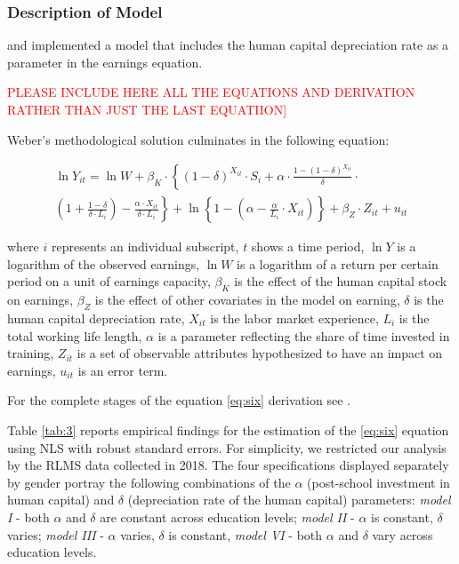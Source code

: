 \documentclass[12pt,a4paper]{article}
\numberwithin{equation}{section}
\begin{document}
\subsubsection{Description of Model}

\citet{arrazola_132b._2005} and  \citep{weber_173._2008, weber_156._2011} implemented a model that includes the human capital depreciation rate as a parameter in the earnings equation.

\begin{Large}
\textcolor{red}{
PLEASE INCLUDE HERE ALL THE EQUATIONS AND DERIVATION RATHER THAN JUST THE LAST EQUATIION]}
\end{Large} 

Weber's methodological solution culminates in the following equation:
 
\begin{multline}\label{eq:six} 
	\ln Y_{i t}= \ln W+\beta_{K} \cdot\left\{(1-\delta)^{X_{i t}} \cdot S_{i}+\alpha \cdot \frac{1-(1-\delta)^{X_{i t}}}{\delta}\right.\cdot\\
	\left.\left(1+\frac{1-\delta}{\delta \cdot L_{i}}\right)-\frac{\alpha \cdot X_{i t}}{\delta \cdot L_{i}}\right\}+\ln \left\{1-\left(\alpha-\frac{\alpha}{L_{i}} \cdot X_{i t}\right)\right\}+\beta_{Z} \cdot Z_{i t}+u_{i t}
\end{multline}

\noindent
where $i$ represents an individual subscript, $t$ shows a time period, $\ln Y$ is a logarithm of the observed earnings, $\ln W$ is a logarithm of a return per certain period on a unit of earnings capacity, $\beta_{K}$ is the effect of the human capital stock on earnings, $\beta_{Z}$ is the effect of other covariates in the model on earning, $\delta$ is the human capital depreciation rate, $X_{i t}$ is the labor market experience, $L_{i}$ is the total working life length, $\alpha$ is a parameter reflecting the share of time invested in training, $Z_{i t}$ is a set of observable attributes hypothesized to have an impact on earnings, $u_{i t}$ is an error term.

For the complete stages of the equation \ref{eq:six} derivation see \parencite{weber_173._2008}.

Table \ref{tab:3} reports empirical findings for the estimation of the \ref{eq:six} equation using NLS with robust standard errors. For simplicity, we restricted our analysis by the RLMS data collected in 2018. The four specifications displayed separately by gender portray the following combinations of the $\alpha$ (post-school investment in human capital) and $\delta$ (depreciation rate of the human capital) parameters: \textit{model I} - both $\alpha$ and $\delta$ are constant across education levels; \textit{model II} - $\alpha$ is constant, $\delta$ varies; \textit{model III} - $\alpha$ varies, $\delta$ is constant, \textit{model VI} - both $\alpha$ and $\delta$ vary across education levels.
\end{document}
